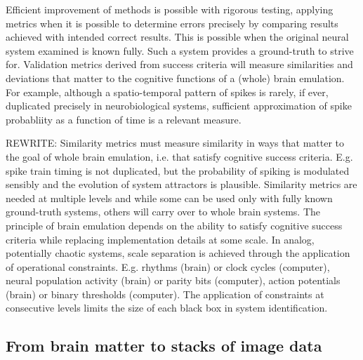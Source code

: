 \documentclass{ldr-article}
\begin{document}
Efficient improvement of methods is possible with rigorous testing, applying metrics when it is possible to determine errors precisely by comparing results achieved with intended correct results. This is possible when the original neural system examined is known fully. Such a system provides a ground-truth to strive for. Validation metrics derived from success criteria will measure similarities and deviations that matter to the cognitive functions of a (whole) brain emulation. For example, although a spatio-temporal pattern of spikes is rarely, if ever, duplicated precisely in neurobiological systems, sufficient approximation of spike probabliity as a function of time is a relevant measure.

\alert{REWRITE}:
Similarity metrics must measure similarity in ways that matter to the goal of whole brain emulation, i.e. that satisfy cognitive success criteria. E.g. spike train timing is not duplicated, but the probability of spiking is modulated sensibly and the evolution of system attractors is plausible. Similarity metrics are needed at multiple levels and while some can be used only with fully known ground-truth systems, others will carry over to whole brain systems. The principle of brain emulation depends on the ability to satisfy cognitive success criteria while replacing implementation details at some scale. In analog, potentially chaotic systems, scale separation is achieved through the application of operational constraints. E.g. rhythms (brain) or clock cycles (computer), neural population activity (brain) or parity bits (computer), action potentials (brain) or binary thresholds (computer). The application of constraints at consecutive levels limits the size of each black box in system identification.


\subsection{From brain matter to stacks of image data}
\end{document}
